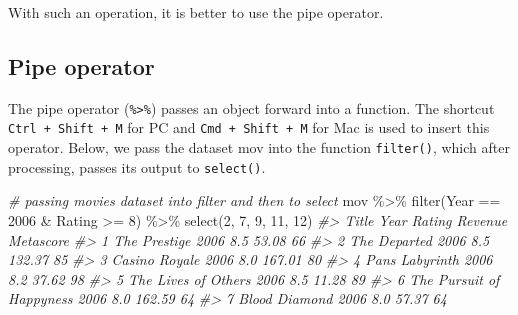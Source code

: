 \documentclass[
]{book}
\newenvironment{Shaded}{\begin{snugshade}}{\end{snugshade}}
\newcommand{\CommentTok}[1]{\textcolor[rgb]{0.56,0.35,0.01}{\textit{#1}}}
\newcommand{\DecValTok}[1]{\textcolor[rgb]{0.00,0.00,0.81}{#1}}
\newcommand{\FunctionTok}[1]{\textcolor[rgb]{0.00,0.00,0.00}{#1}}
\newcommand{\NormalTok}[1]{#1}
\newcommand{\SpecialCharTok}[1]{\textcolor[rgb]{0.00,0.00,0.00}{#1}}
\begin{document}
With such an operation, it is better to use the pipe operator.

\hypertarget{pipe-operator}{%
\subsection{Pipe operator}\label{pipe-operator}}

The pipe operator (\texttt{\%\textgreater{}\%}) passes an object forward into a function. The shortcut \texttt{Ctrl\ +\ Shift\ +\ M} for PC and \texttt{Cmd\ +\ Shift\ +\ M} for Mac is used to insert this operator. Below, we pass the dataset mov into the function \texttt{filter()}, which after processing, passes its output to \texttt{select()}.

\begin{Shaded}
\begin{Highlighting}[]
\CommentTok{\# passing movies dataset into filter and then to select}
\NormalTok{mov }\SpecialCharTok{\%\textgreater{}\%}
  \FunctionTok{filter}\NormalTok{(Year }\SpecialCharTok{==} \DecValTok{2006} \SpecialCharTok{\&}\NormalTok{ Rating }\SpecialCharTok{\textgreater{}=} \DecValTok{8}\NormalTok{) }\SpecialCharTok{\%\textgreater{}\%}
  \FunctionTok{select}\NormalTok{(}\DecValTok{2}\NormalTok{, }\DecValTok{7}\NormalTok{, }\DecValTok{9}\NormalTok{, }\DecValTok{11}\NormalTok{, }\DecValTok{12}\NormalTok{)}
\CommentTok{\#\textgreater{}                      Title Year Rating Revenue Metascore}
\CommentTok{\#\textgreater{} 1             The Prestige 2006    8.5   53.08        66}
\CommentTok{\#\textgreater{} 2             The Departed 2006    8.5  132.37        85}
\CommentTok{\#\textgreater{} 3            Casino Royale 2006    8.0  167.01        80}
\CommentTok{\#\textgreater{} 4          Pan\textquotesingle{}s Labyrinth 2006    8.2   37.62        98}
\CommentTok{\#\textgreater{} 5      The Lives of Others 2006    8.5   11.28        89}
\CommentTok{\#\textgreater{} 6 The Pursuit of Happyness 2006    8.0  162.59        64}
\CommentTok{\#\textgreater{} 7            Blood Diamond 2006    8.0   57.37        64}


\end{Highlighting}
\end{Shaded}
\end{document}
